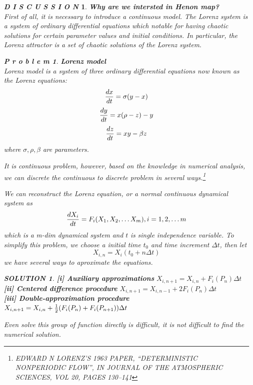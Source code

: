 \documentclass[12pt]{article}
\theoremstyle{plain}
\newtheorem{problem}{\textbf{P r o b l e m}}[section]
\newtheorem{solution}{\textit{SOLUTION}}[section]
\newtheorem{discussion}{\textit{D I S C U S S I O N}}[section]
\begin{document}
\begin{discussion} \textbf{Why are we intersted in Henon map?}
\\\noindent First of all, it is necessary to introduce a continuous model. The Lorenz system is a system of ordinary differential equations which notable for having chaotic solutions for certain parameter values and initial conditions. In particular, the Lorenz attractor is a set of chaotic solutions of the Lorenz system.

\begin{problem}\textbf{Lorenz model}
\\\noindent Lorenz model is a system of three ordinary differential equations now known as the Lorenz equations:
$$
{dx \over dt} = \sigma(y - x)
$$
$$
{dy \over dt} = x(\rho - z) - y
$$
$$
{dz \over dt} = xy - \beta z
$$
where $\sigma, \rho, \beta$ are parameters.
\end{problem}

It is continuous problem, however, based on the knowledge in numerical analysis, we can discrete the continuous to discrete problem in several ways.\footnote{EDWARD N LORENZ’S 1963 PAPER, “DETERMINISTIC NONPERIODIC FLOW”, IN JOURNAL OF THE ATMOSPHERIC SCIENCES, VOL 20, PAGES 130–141} 

We can reconstruct the Lorenz equation, or a normal continuous dynamical system as 
$$
{dX_i\over dt} = F_i(X_1, X_2, \ldots X_m), i = 1, 2, \ldots m
$$
which is a m-dim dynamical system and $t$ is single independence variable. To simplify this problem, we choose a initial time $t_0$ and time increment $\Delta t$, then let 
$$
X_{i, n} = X_i (t_0 + n \Delta t)
$$
we have several ways to aproximate the equations.



{\color{blue}
\begin{solution}\textbf{[i] Auxiliary approximations} $X_{i, n+1} = X_{i, n} + F_i(P_n)\Delta t$
\\\noindent \textbf{[ii] Centered difference procedure} $X_{i, n+1} = X_{i, n-1} + 2F_i(P_n)\Delta t$
\\\noindent \textbf{[iii] Double-approximation procedure} $X_{i, n+1} = X_{i, n} + {1\over 2}(F_i(P_n) + F_i(P_{n+1}))\Delta t$
\end{solution}
}


Even solve this group of function directly is difficult, it is not difficult to find the numerical solution. \\[2ex]


\end{discussion}
\end{document}
